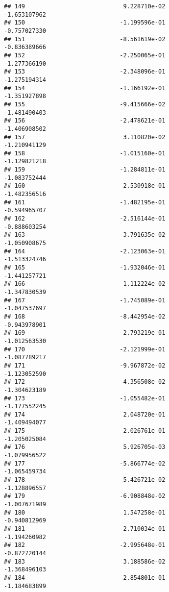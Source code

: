 \documentclass[
]{article}
\begin{document}
\begin{verbatim}
## 149                            9.228710e-02               -1.653107962
## 150                           -1.199596e-01               -0.757027330
## 151                           -8.561619e-02               -0.836389666
## 152                           -2.250065e-01               -1.277366190
## 153                           -2.348096e-01               -1.275194314
## 154                           -1.166192e-01               -1.351927898
## 155                           -9.415666e-02               -1.481490403
## 156                           -2.478621e-01               -1.406908502
## 157                            3.110820e-02               -1.210941129
## 158                           -1.015160e-01               -1.129821218
## 159                           -1.284811e-01               -1.083752444
## 160                           -2.530918e-01               -1.482356516
## 161                           -1.482195e-01               -0.594965707
## 162                           -2.516144e-01               -0.888603254
## 163                           -3.791635e-02               -1.050908675
## 164                           -2.123063e-01               -1.513324746
## 165                           -1.932046e-01               -1.441257721
## 166                           -1.112224e-02               -1.347830539
## 167                           -1.745089e-01               -1.047537697
## 168                           -8.442954e-02               -0.943978901
## 169                           -2.793219e-01               -1.012563530
## 170                           -2.121999e-01               -1.087789217
## 171                           -9.967872e-02               -1.123052590
## 172                           -4.356508e-02               -1.304623189
## 173                           -1.055482e-01               -1.177552245
## 174                            2.048720e-01               -1.409494077
## 175                           -2.026761e-01               -1.205025084
## 176                            5.926705e-03               -1.079956522
## 177                           -5.866774e-02               -1.065459734
## 178                           -5.426721e-02               -1.128896557
## 179                           -6.908848e-02               -1.007671989
## 180                            1.547258e-01               -0.940812969
## 181                           -2.710034e-01               -1.194260982
## 182                           -2.995648e-01               -0.872720144
## 183                            3.188586e-02               -1.368496103
## 184                           -2.854801e-01               -1.184683899

\end{verbatim}
\end{document}
